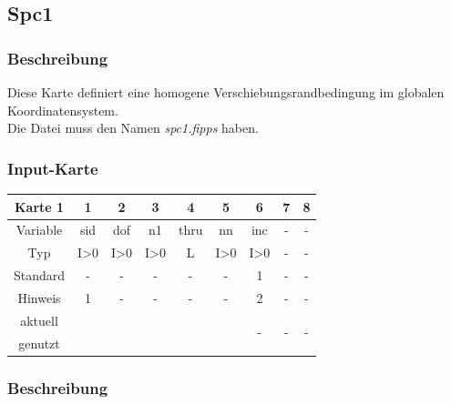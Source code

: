 \documentclass[11pt,titlepage,listof=totoc,bibliography=totoc,twoside]{scrreprt}
\begin{document}
{{\newpage

\subsection{Spc1}

\subsubsection{Beschreibung}

Diese Karte definiert eine homogene Verschiebungsrandbedingung im globalen Koordinatensystem.\\
Die Datei muss den Namen \emph{spc1.fipps} haben.

\subsubsection{Input-Karte}

\begin{table}[htbp]
\centering
\begin{tabularx}{\textwidth}{cCCCCCCCC}
\toprule
Karte 1	& 1		& 2		& 3		& 4		& 5		& 6		& 7		& 8		\\
\midrule
Variable& sid		& dof		& n1		& thru		& nn		& inc		& -		& -		\\
Typ	& I>0		& I>0		& I>0		& L		& I>0		& I>0		& -		& -		\\
Standard& -		& -		& -		& -		& -		& 1		& -		& -		\\
Hinweis	& 1		& -		& -		& -		& -		& 2		& -		& -		\\
aktuell	& 	& 	& 	& 	& 	& 	& \multirow{2}{*}{-}	& 	\\
genutzt \\
\bottomrule
\end{tabularx}
\end{table}

\subsubsection{Beschreibung}

}}
\end{document}
